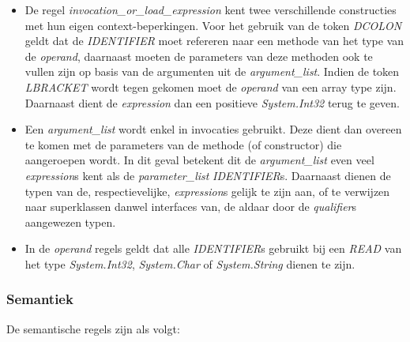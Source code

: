 \begin{itemize}
	\item De regel \textit{invocation\_or\_load\_expression} kent twee verschillende constructies met hun eigen context-beperkingen. Voor het gebruik van de token \textit{DCOLON} geldt dat de \textit{IDENTIFIER} moet refereren naar een methode van het type van de \textit{operand}, daarnaast moeten de parameters van deze methoden ook te vullen zijn op basis van de argumenten uit de \textit{argument\_list}. Indien de token \textit{LBRACKET} wordt tegen gekomen moet de \textit{operand} van een array type zijn. Daarnaast dient de \textit{expression} dan een positieve \textit{System.Int32} terug te geven.
	\item Een \textit{argument\_list} wordt enkel in invocaties gebruikt. Deze dient dan overeen te komen met de parameters van de methode (of constructor) die aangeroepen wordt. In dit geval betekent dit de \textit{argument\_list} even veel \textit{expression}s kent als de \textit{parameter\_list} \textit{IDENTIFIER}s. Daarnaast dienen de typen van de, respectievelijke, \textit{expression}s gelijk te zijn aan, of te verwijzen naar superklassen danwel interfaces van, de aldaar door de \textit{qualifier}s aangewezen typen.
	\item In de \textit{operand} regels geldt dat alle \textit{IDENTIFIER}s gebruikt bij een \textit{READ} van het type \textit{System.Int32}, \textit{System.Char} of \textit{System.String} dienen te zijn.
\end{itemize}

\subsubsection{Semantiek}
De semantische regels zijn als volgt:

